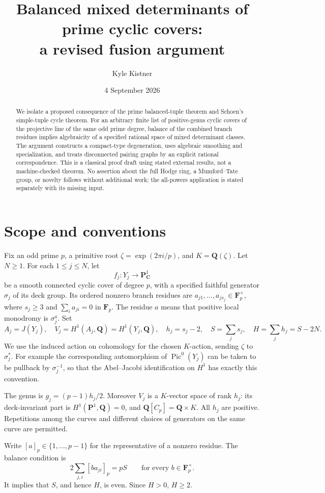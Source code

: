 \documentclass[11pt]{article}
\title{Balanced mixed determinants of prime cyclic covers:\\a revised fusion argument}
\author{Kyle Kistner}
\date{4 September 2026}
\theoremstyle{definition}
\newcommand{\Q}{\mathbf Q}
\newcommand{\C}{\mathbf C}
\newcommand{\F}{\mathbf F}
\newcommand{\Pic}{\operatorname{Pic}}
\begin{document}
\maketitle
\begin{abstract}
We isolate a proposed consequence of the prime balanced-tuple theorem and
Schoen's simple-tuple cycle theorem. For an arbitrary finite list of positive-genus
cyclic covers of the projective line of the same odd prime degree, balance of the
combined branch residues implies algebraicity of a specified rational space of
mixed determinant classes. The argument constructs a compact-type degeneration,
uses algebraic smoothing and specialization, and treats disconnected pairing
graphs by an explicit rational correspondence. This is a classical proof draft
using stated external results, not a machine-checked theorem. No assertion about
the full Hodge ring, a Mumford--Tate group, or novelty follows without additional
work; the all-powers application is stated separately with its missing input.
\end{abstract}

\section{Scope and conventions}
Fix an odd prime $p$, a primitive root $\zeta=\exp(2\pi i/p)$, and
$K=\Q(\zeta)$. Let $N\geq1$. For each $1\leq j\leq N$, let
\[
 f_j:Y_j\longrightarrow\mathbf P^1_\C
\]
be a smooth connected cyclic cover of degree $p$, with a specified faithful
generator $\sigma_j$ of its deck group. Its ordered nonzero branch residues are
$a_{j1},\ldots,a_{js_j}\in\F_p^\times$, where $s_j\geq3$ and
$\sum_i a_{ji}=0$ in $\F_p$. The residue $a$ means that positive local
monodromy is $\sigma_j^a$. Set
\[
 A_j=J(Y_j),\quad V_j=H^1(A_j,\Q)=H^1(Y_j,\Q),\quad
 h_j=s_j-2,\quad S=\sum_j s_j,\quad H=\sum_j h_j=S-2N.
\]
We use the induced action on cohomology for the chosen $K$-action, sending
$\zeta$ to $\sigma_j^*$. For example the corresponding automorphism of
$\Pic^0(Y_j)$ can be taken to be pullback by $\sigma_j^{-1}$, so that the
Abel--Jacobi identification on $H^1$ has exactly this convention.

The genus is $g_j=(p-1)h_j/2$. Moreover $V_j$ is a $K$-vector space of
rank $h_j$: its deck-invariant part is $H^1(\mathbf P^1,\Q)=0$, and
$\Q[C_p]=\Q\times K$. All $h_j$ are positive. Repetitions among the curves
and different choices of generators on the same curve are permitted.

Write $[a]_p\in\{1,\ldots,p-1\}$ for the representative of a nonzero residue.
The balance condition is
\begin{equation}\label{eq:balance}
 2\sum_{j,i}[b a_{ji}]_p=pS\qquad\text{for every }b\in\F_p^\times.
\end{equation}
It implies that $S$, and hence $H$, is even. Since $H>0$, $H\geq2$.
\end{document}
